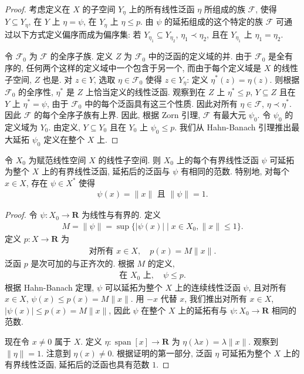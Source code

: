 \documentclass[../../main.tex]{subfiles}
\begin{document}
\begin{proof}
考虑定义在 $X$ 的子空间 $Y_{\eta}$ 上的所有线性泛函 $\eta$ 所组成的族 $\mathcal{F}$, 使得 $Y\subseteq Y_{\eta}$, 在 $Y$ 上 $\eta=\psi$, 在 $Y_{\eta}$ 上 $\eta\leqslant p$. 由 $\psi$ 的延拓组成的这个特定的族 $\mathcal{F}$ 可通过以下方式定义偏序而成为偏序集: 若 $Y_{\eta_{1}}\subseteq Y_{\eta_{2}}$, $\eta_{1}\prec\eta_{2}$, 且在 $Y_{\eta_{1}}$ 上 $\eta_{1}=\eta_{2}$.

令 $\mathcal{F}_{0}$ 为 $\mathcal{F}$ 的全序子族. 定义 $Z$ 为 $\mathcal{F}_{0}$ 中的泛函的定义域的并. 由于 $\mathcal{F}_{0}$ 是全有序的, 任何两个这样的定义域中一个包含于另一个, 而由于每个定义域是 $X$ 的线性子空间, $Z$ 也是. 对 $z\in Y$, 选取 $\eta\in\mathcal{F}_{0}$ 使得 $z\in Y_{\eta}$: 定义 $\eta^{*}(z)=\eta(z)$. 则根据 $\mathcal{F}_{0}$ 的全序性, $\eta^{*}$ 是 $Z$ 上恰当定义的线性泛函. 观察到在 $Z$ 上 $\eta^{*}\leqslant p$, $Y\subseteq Z$ 且在 $Y$ 上 $\eta^{*}=\psi$, 由于 $\mathcal{F}_{0}$ 中的每个泛函具有这三个性质. 因此对所有 $\eta\in\mathcal{F}$, $\eta\prec\eta^{*}$. 因此 $\mathcal{F}$ 的每个全序子族有上界. 因此, 根据 Zorn 引理, $\mathcal{F}$ 有最大元 $\psi_{0}$. 令 $\psi_{0}$ 的定义域为 $Y_{0}$. 由定义, $Y\subseteq Y_{0}$ 且在 $Y_{0}$ 上 $\psi_{0}\leqslant p$. 我们从 Hahn-Banach 引理推出最大延拓 $\psi_{0}$ 定义在整个 $X$ 上.
\end{proof}

\begin{theorem}\label{theorem:ch14-范数延拓}
令 $X_{0}$ 为赋范线性空间 $X$ 的线性子空间. 则 $X_{0}$ 上的每个有界线性泛函 $\psi$ 可延拓为整个 $X$ 上的有界线性泛函, 延拓后的泛函与 $\psi$ 有相同的范数. 特别地, 对每个 $x\in X$, 存在 $\psi\in X^{*}$ 使得
\begin{align}
\psi(x)=\|x\|\text{ 且 }\|\psi\|=1.\label{align:ch14-范数延拓}
\end{align}
\end{theorem}

\begin{proof}
令 $\psi:X_{0}\to\mathbf{R}$ 为线性与有界的. 定义
\begin{align*}
M=\|\psi\|=\sup\{|\psi(x)|\mid x\in X_{0},\|x\|\leqslant 1\}.
\end{align*}
定义 $p:X\to\mathbf{R}$ 为
\begin{align*}
\text{对所有 }x\in X,\quad p(x)=M\|x\|.
\end{align*}
泛函 $p$ 是次可加的与正齐次的. 根据 $M$ 的定义,
\begin{align*}
\text{在 }X_{0}\text{ 上},\quad\psi\leqslant p.
\end{align*}
根据 Hahn-Banach 定理, $\psi$ 可以延拓为整个 $X$ 上的连续线性泛函 $\psi$, 且对所有 $x\in X$, $\psi(x)\leqslant p(x)=M\|x\|$. 用 $-x$ 代替 $x$, 我们推出对所有 $x\in X$, $|\psi(x)|\leqslant p(x)=M\|x\|$, 因此 $\psi$ 在整个 $X$ 上的延拓有与 $\psi:X_{0}\to\mathbf{R}$ 相同的范数.

现在令 $x\neq 0$ 属于 $X$. 定义 $\eta:\operatorname{span}[x]\to\mathbf{R}$ 为 $\eta(\lambda x)=\lambda\|x\|$. 观察到 $\|\eta\|=1$. 注意到 $\eta(x)\neq 0$. 根据证明的第一部分, 泛函 $\eta$ 可延拓为整个 $X$ 上的有界线性泛函, 延拓后的泛函也具有范数 $1$.
\end{proof}
\end{document}
